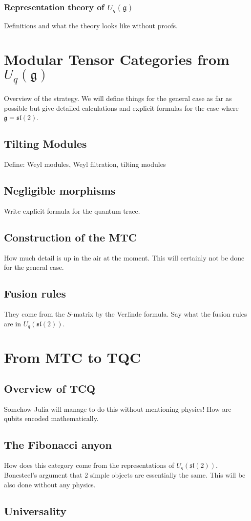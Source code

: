 \documentclass[10pt]{article}
\begin{document}
\subsubsection{Representation theory of $U_q(\mathfrak{g})$}
Definitions and what the theory looks like without proofs.

\section{Modular Tensor Categories from $U_q(\mathfrak{g})$}
Overview of the strategy.  We will define things for the general case as
far as possible but give detailed calculations and explicit formulas for
the case where $\mathfrak{g} = \mathfrak{sl}(2)$.

\subsection{Tilting Modules} Define: Weyl modules, Weyl filtration, tilting
modules

\subsection{Negligible morphisms} Write explicit formula for the quantum
trace. 

\subsection{Construction of the MTC}
How much detail is up in the air at the moment.  This will certainly not be
done for the general case.

\subsection{Fusion rules}
They come from the $S$-matrix by the Verlinde formula.  Say what the fusion
rules are in $U_q(\mathfrak{sl}(2))$.

\section{From MTC to TQC}
\subsection{Overview of TCQ}
Somehow Julia will manage to do this without mentioning physics!  How are
qubits encoded mathematically.  
\subsection{The Fibonacci anyon}
How does this category come from the representations of
$U_q(\mathfrak{sl}(2))$.  Bonesteel's argument that 2 simple objects are
essentially the same.  This will be also done without any physics.
\subsection{Universality}
\end{document}
